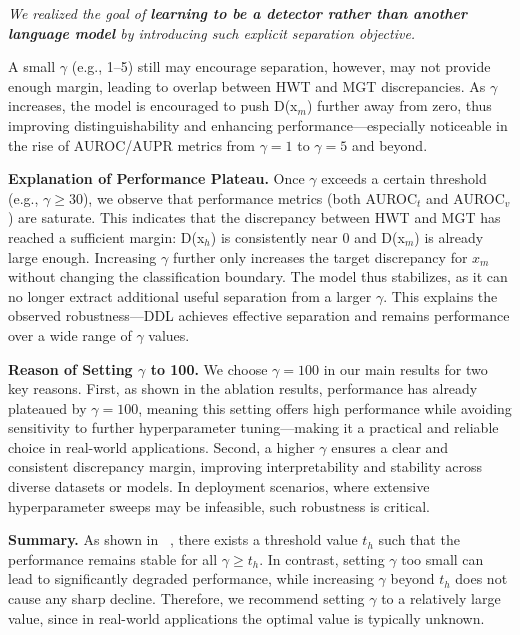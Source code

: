 \documentclass[sigconf, screen, review, anonymous]{acmart}
\begin{document}
\textit{We realized the goal of \textbf{learning to be a detector rather than another language model} by introducing such explicit separation objective. }

A small $\gamma$ (e.g., 1–5) still may encourage separation, however, may not provide enough margin, leading to overlap between HWT and MGT discrepancies. As $\gamma$ increases, the model is encouraged to push D(x$_m$) further away from zero, thus improving distinguishability and enhancing performance—especially noticeable in the rise of AUROC/AUPR metrics from $\gamma=1$ to $\gamma=5$ and beyond.

\noindent \textbf{Explanation of Performance Plateau. }
Once $\gamma$ exceeds a certain threshold (e.g., $\gamma \geq 30$), we observe that performance metrics (both AUROC$_t$ and AUROC$_v$) are saturate. This indicates that the discrepancy between HWT and MGT has reached a sufficient margin: D(x$_h$) is consistently near 0 and D(x$_m$) is already large enough. Increasing $\gamma$ further only increases the target discrepancy for $x_m$ without changing the classification boundary. The model thus stabilizes, as it can no longer extract additional useful separation from a larger $\gamma$. This explains the observed robustness—DDL achieves effective separation and remains performance over a wide range of $\gamma$ values.

\noindent \textbf{Reason of Setting $\gamma$ to 100. }
We choose $\gamma=100$ in our main results for two key reasons. First, as shown in the ablation results, performance has already plateaued by $\gamma=100$, meaning this setting offers high performance while avoiding sensitivity to further hyperparameter tuning—making it a practical and reliable choice in real-world applications. Second, a higher $\gamma$ ensures a clear and consistent discrepancy margin, improving interpretability and stability across diverse datasets or models. In deployment scenarios, where extensive hyperparameter sweeps may be infeasible, such robustness is critical.

\noindent \textbf{Summary. }
As shown in ~, there exists a threshold value $t_h$ such that the performance remains stable for all $\gamma \geq t_h$.
%
In contrast, setting $\gamma$ too small can lead to significantly degraded performance, while increasing $\gamma$ beyond $t_h$ does not cause any sharp decline.
%
Therefore, we recommend setting $\gamma$ to a relatively large value, since in real-world applications the optimal value is typically unknown.
\end{document}
